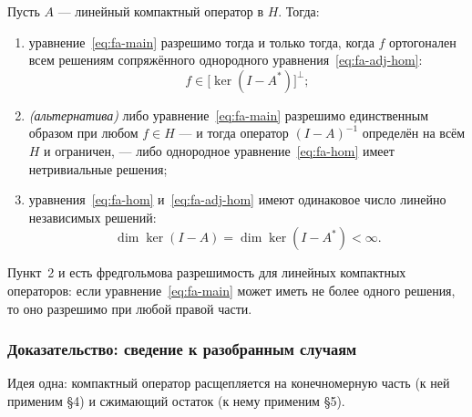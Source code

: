 \begin{theorem}\label{thm:fredholm}
Пусть $A$ — линейный компактный оператор в $H$. Тогда:
\begin{enumerate}[label=\arabic*), leftmargin=2em]
  \item уравнение~\eqref{eq:fa-main} разрешимо тогда и только тогда, когда
        $f$ ортогонален всем решениям сопряжённого однородного
        уравнения~\eqref{eq:fa-adj-hom}:
        \[
          f \in \big[\ker(I - A^*)\big]^{\perp} ;
        \]
  \item \emph{(альтернатива)} либо уравнение~\eqref{eq:fa-main} разрешимо
        единственным образом при любом $f \in H$ — и тогда оператор
        $(I-A)^{-1}$ определён на всём $H$ и ограничен, — либо однородное
        уравнение~\eqref{eq:fa-hom} имеет нетривиальные решения;
  \item уравнения~\eqref{eq:fa-hom} и~\eqref{eq:fa-adj-hom} имеют одинаковое
        число линейно независимых решений:
        \[
          \dim \ker(I - A) = \dim \ker(I - A^*) < \infty .
        \]
\end{enumerate}
\end{theorem}

\begin{remark}
Пункт~2 и есть фредгольмова разрешимость для линейных компактных операторов:
если уравнение~\eqref{eq:fa-main} может иметь не более одного решения, то оно
разрешимо при любой правой части.
\end{remark}

\subsubsection*{Доказательство: сведение к разобранным случаям}

Идея одна: компактный оператор расщепляется на конечномерную часть (к ней
применим \S4) и сжимающий остаток (к нему применим \S5).

